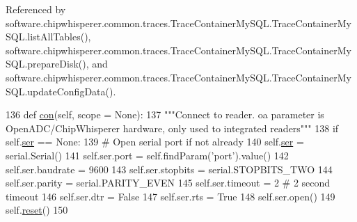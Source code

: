 


Referenced by software.\+chipwhisperer.\+common.\+traces.\+Trace\+Container\+My\+S\+Q\+L.\+Trace\+Container\+My\+S\+Q\+L.\+list\+All\+Tables(), software.\+chipwhisperer.\+common.\+traces.\+Trace\+Container\+My\+S\+Q\+L.\+Trace\+Container\+My\+S\+Q\+L.\+prepare\+Disk(), and software.\+chipwhisperer.\+common.\+traces.\+Trace\+Container\+My\+S\+Q\+L.\+Trace\+Container\+My\+S\+Q\+L.\+update\+Config\+Data().


\begin{DoxyCode}
136     \textcolor{keyword}{def }\hyperlink{classsoftware_1_1chipwhisperer_1_1capture_1_1targets_1_1smartcard__readers_1_1system__ser_1_1ReaderSystemSER_a3a1b6b662730c81908f3edd42a1bee6f}{con}(self, scope = None):
137         \textcolor{stringliteral}{"""Connect to reader. oa parameter is OpenADC/ChipWhisperer hardware, only used to integrated
       readers"""}
138         \textcolor{keywordflow}{if} self.\hyperlink{classsoftware_1_1chipwhisperer_1_1capture_1_1targets_1_1smartcard__readers_1_1system__ser_1_1ReaderSystemSER_a1366a3ad94087e220983c9c33093855e}{ser} == \textcolor{keywordtype}{None}:
139             \textcolor{comment}{# Open serial port if not already}
140             self.\hyperlink{classsoftware_1_1chipwhisperer_1_1capture_1_1targets_1_1smartcard__readers_1_1system__ser_1_1ReaderSystemSER_a1366a3ad94087e220983c9c33093855e}{ser} = serial.Serial()
141             self.ser.port = self.findParam(\textcolor{stringliteral}{'port'}).value()
142             self.ser.baudrate = 9600
143             self.ser.stopbits = serial.STOPBITS\_TWO
144             self.ser.parity = serial.PARITY\_EVEN
145             self.ser.timeout = 2     \textcolor{comment}{# 2 second timeout}
146             self.ser.dtr = \textcolor{keyword}{False}
147             self.ser.rts = \textcolor{keyword}{True}
148             self.ser.open()
149         self.\hyperlink{classsoftware_1_1chipwhisperer_1_1capture_1_1targets_1_1smartcard__readers_1_1system__ser_1_1ReaderSystemSER_a8fdb0d812cfbc6e1a9552ac696652195}{reset}()
150 
\end{DoxyCode}
\hypertarget{classsoftware_1_1chipwhisperer_1_1capture_1_1targets_1_1smartcard__readers_1_1system__ser_1_1ReaderSystemSER_a31595bd9eb93430f55d4e63785d62da0}{}
